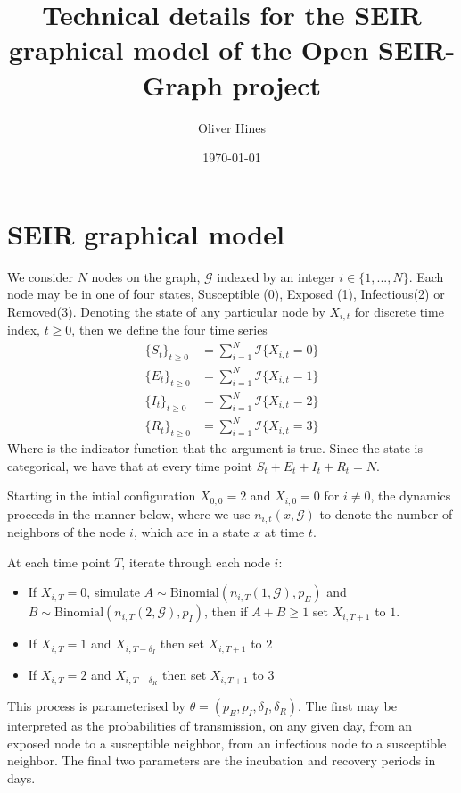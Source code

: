 \documentclass{article}
\title{Technical details for the SEIR graphical model of the Open SEIR-Graph project}
\author{Oliver Hines}
\date{\today}
\begin{document}
    \maketitle
\section{SEIR graphical model}
    We consider $N$ nodes on the graph, $\mathcal{G}$ indexed by an integer $i \in \{1,...,N\}$. Each node may be in one of four states,
    Susceptible (0), Exposed (1), Infectious(2) or Removed(3). Denoting the state of any particular node by $X_{i,t}$
    for discrete time index, $t\geq 0$, then we define the four time series
    \begin{align*}
        \{S_t\}_{t\geq 0} &= \sum_{i=1}^N \mathcal{I}\{X_{i,t} = 0\} \\
        \{E_t\}_{t\geq 0} &= \sum_{i=1}^N \mathcal{I}\{X_{i,t} = 1\} \\
        \{I_t\}_{t\geq 0} &= \sum_{i=1}^N \mathcal{I}\{X_{i,t} = 2\} \\
        \{R_t\}_{t\geq 0} &= \sum_{i=1}^N \mathcal{I}\{X_{i,t} = 3\}
    \end{align*}
    Where  is the indicator function that the argument is true. Since the state is categorical, we have that
    at every time point $S_t + E_t + I_t + R_t = N$.

    Starting in the intial configuration $X_{0,0} = 2$ and $X_{i,0}=0$ for $i\neq 0$, the dynamics proceeds in the
    manner below, where we use $n_{i,t}(x,\mathcal{G})$ to denote the number of neighbors of the node $i$, which are in a state $x$ at time $t$.

    At each time point $T$, iterate through each node $i$:
    \begin{itemize}
        \item If $X_{i,T} = 0$, simulate $A \sim \text{Binomial}(n_{i,T}(1,\mathcal{G}),p_E)$ and
              $B \sim \text{Binomial}(n_{i,T}(2,\mathcal{G}),p_I)$, then if $A+B \geq 1$ set $X_{i,T+1}$ to $1$.
        \item If $X_{i,T} = 1$ and $X_{i,T-\delta_I}$ then set $X_{i,T+1}$ to $2$
        \item If $X_{i,T} = 2$ and $X_{i,T-\delta_R}$ then set $X_{i,T+1}$ to $3$
    \end{itemize}

    This process is parameterised by $\theta = (p_E,p_I,\delta_I,\delta_R)$. The first may be interpreted as the
    probabilities of transmission, on any given day, from an exposed node to a susceptible neighbor,
    from an infectious node to a susceptible neighbor. The final two parameters are
    the incubation and recovery periods in days.
\end{document}
